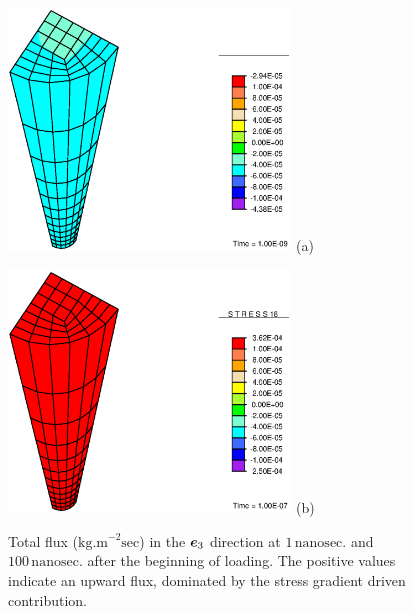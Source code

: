\begin{figure}[ht]
\begin{minipage}[t]{7.5cm}
{\includegraphics[width=7.5cm]{images/M-1.eps}} \hskip 3cm (a)
\end{minipage}
\begin{minipage}[t]{7.5cm}
{\includegraphics[width=7.5cm]{images/M-100.eps}} \hskip 3cm (b)
\end{minipage}
\caption{Total flux ($\mathrm{kg.m}^{-2}\mathrm{sec}$) in the
$\mbox{\boldmath$ e$}_3$ direction at $1 \,\mathrm{nanosec.}$ and
$100\,\mathrm{nanosec.}$ after the beginning of loading. The
positive values indicate an upward flux, dominated by the stress
gradient driven contribution.} \label{Mfig}
\end{figure}

